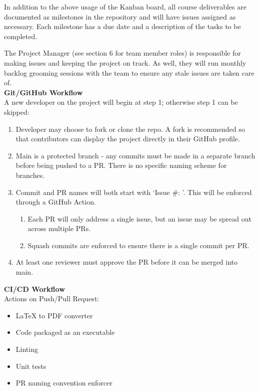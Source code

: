 \documentclass{article}
\begin{document}
In addition to the above usage of the Kanban board, all course deliverables are documented as milestones in the repository and will have issues assigned as necessary. Each milestone has a due date and a description of the tasks to be completed.

The Project Manager (see section 6 for team member roles) is responsible for making issues and keeping the project on track. As well, they will run monthly backlog grooming sessions with the team to ensure any stale issues are taken care of. \\

\noindent
\textbf{Git/GitHub Workflow}\\
A new developer on the project will begin at step 1; otherwise step 1 can be skipped:
\begin{enumerate}
  \item Developer may choose to fork or clone the repo. A fork is recommended so that contributors can display the project directly in their GitHub profile.
  \item Main is a protected branch - any commits must be made in a separate branch before being pushed to a PR. There is no specific naming scheme for branches.
  \item Commit and PR names will both start with ‘Issue \#: ’. This will be enforced through a GitHub Action.
  \begin{enumerate}
    \item Each PR will only address a single issue, but an issue may be spread out across multiple PRs.
    \item Squash commits are enforced to ensure there is a single commit per PR.
  \end{enumerate}
  \item At least one reviewer must approve the PR before it can be merged into main.\\
\end{enumerate}


\noindent
\textbf{CI/CD Workflow}\\
Actions on Push/Pull Request:
\begin{itemize}
  \item LaTeX to PDF converter
  \item Code packaged as an executable
  \item Linting
  \item Unit tests
  \item PR naming convention enforcer
\end{itemize}
\end{document}
